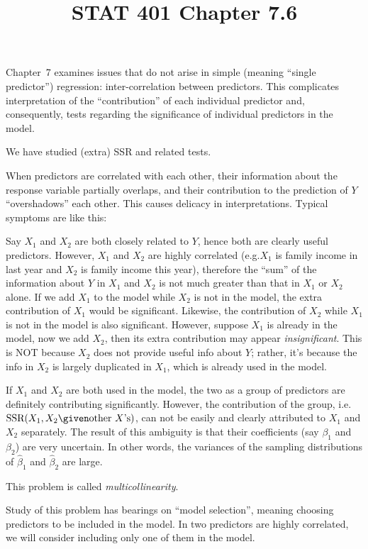 \documentclass[12pt]{article}
\newcommand{\SSR}{\text{SSR}}
\begin{document}
\title{STAT 401 Chapter 7.6}
\maketitle

Chapter~7 examines issues that do not arise in simple (meaning
``single predictor'') regression: inter-correlation between predictors.
This complicates interpretation of the ``contribution'' of each
individual predictor and, consequently, tests regarding the significance
of individual predictors in the model.

We have studied (extra) SSR and related tests.

When predictors are correlated with each other,
their information about the response variable partially overlaps,
and their contribution to the prediction of $Y$ ``overshadows'' each
other.
This causes delicacy in interpretations.
Typical symptoms are like this:

Say $X_1$ and $X_2$ are both closely related to $Y$,
hence both are clearly useful predictors.
However, $X_1$ and $X_2$ are highly correlated
(e.g.\@ $X_1$ is family income in last year and $X_2$ is family income
this year), therefore the ``sum'' of the information about $Y$
in $X_1$ and $X_2$ is not much greater than that in $X_1$ or $X_2$
alone.
If we add $X_1$ to the model while $X_2$ is not in the model,
the extra contribution of $X_1$ would be significant.
Likewise, the contribution of $X_2$ while $X_1$ is not in the model
is also significant.
However, suppose $X_1$ is already in the model,
now we add $X_2$, then its extra contribution may appear
\emph{insignificant}.
This is NOT because $X_2$ does not provide useful info about $Y$;
rather, it's because the info in $X_2$ is largely duplicated in $X_1$,
which is already used in the model.

If $X_1$ and $X_2$ are both used in the model,
the two as a group of predictors are definitely contributing
significantly.
However,
the contribution of the group,
i.e.\@ $\SSR(X_1, X_2\given \text{other $X$'s})$,
can not be easily and clearly attributed to
$X_1$ and $X_2$ separately.
The result of this ambiguity is that
their coefficients (say $\beta_1$ and $\beta_2$) are very uncertain.
In other words,
the variances of the sampling distributions of $\hat{\beta}_1$ and
$\hat{\beta}_2$ are large.

This problem is called \emph{multicollinearity}.

Study of this problem has bearings on ``model selection'',
meaning choosing predictors to be included in the model.
In two predictors are highly correlated,
we will consider including only one of them in the model.
\end{document}
